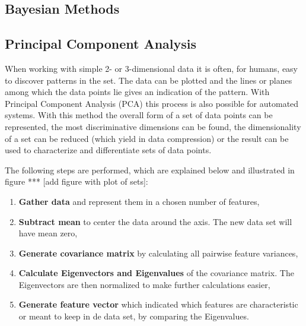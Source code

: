 \subsection{Bayesian Methods}

\subsection{Principal Component Analysis}
When working with simple 2- or 3-dimensional data it is often, for humans,
easy to discover patterns in the set. The data can be plotted and the lines or
planes among which the data points lie gives an indication of the pattern.
With Principal Component Analysis (PCA) this process is also possible for
automated systems. With this method the overall form of a set of data points
can be represented, the most discriminative dimensions can be found, the
dimensionality of a set can be reduced (which yield in data compression) or
the result can be used to characterize and differentiate sets of data points.

The following steps are performed, which are explained below and illustrated
in figure *** [add figure with plot of sets]:

\begin{enumerate}
	\item \textbf{Gather data} and represent them in a chosen number of
	features,
	\item \textbf{Subtract mean} to center the data around the axis. The new
	data set will have mean zero,
	\item \textbf{Generate covariance matrix} by calculating all pairwise
	feature variances,
	\item \textbf{Calculate Eigenvectors and Eigenvalues} of the covariance
	matrix. The Eigenvectors are then normalized to make further calculations
	easier,
	\item \textbf{Generate feature vector} which indicated which features are
	characteristic or meant to keep in de data set, by comparing the
	Eigenvalues.
\end{enumerate}

